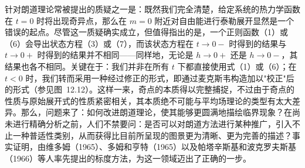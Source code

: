 针对朗道理论常被提出的质疑之一是：既然我们完全清楚，给定系统的热力学函数在 \(t=0\) 时将出现奇异点，那么在 \(m=0\) 附近对自由能进行泰勒展开显然是一个错误的起点。尽管这一质疑确实成立，但值得指出的是，一个正则函数（1）或（6）会导出状态方程（3）或（7），而该状态方程在 \(t\to 0-\) 时得到的结果与 \(t\to 0+\) 时得到的结果并不相同——同样地，无论是 \(h\to 0+\) 还是 \(h\to 0-\)，其结果也各不相同。关键在于：我们并非在所有 \(t\) 下都直接使用式（1）或（6）；在 \(t<0\) 时，我们转而采用一种经过修正的形式，即通过麦克斯韦构造加以"校正"后的形式（参见图~12.12）。这样一来，奇点的本质得以完整捕捉，不过由于奇点的性质与原始展开式的性质紧密相关，其本质绝不可能与平均场理论的类型有太大差异。那么，问题来了：如何改进朗道理论，使其能够更圆满地描绘临界现象？在尚未进行精确分析之前，人们不禁要问：是否可以对朗道方法进行某种推广，引入不止一种普适性类别，从而获得比目前所呈现的图景更为清晰、更为完善的描述？事实证明，由维多姆（1965）、多姆和亨特（1965）以及帕塔辛斯基和波克罗夫斯基（1966）等人率先提出的标度方法，为这一领域迈出了正确的一步。
